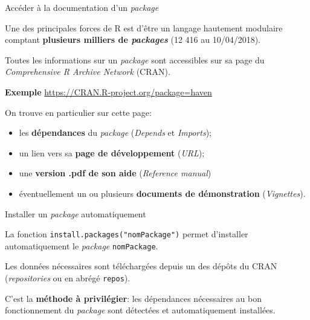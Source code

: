 \documentclass[12pt,ignorenonframetext,]{beamer}
\providecommand{\tightlist}{%
  \setlength{\itemsep}{0pt}\setlength{\parskip}{0pt}}
\newcommand{\intertitre}[1]{\textcolor{redInsee}{\textbf{#1}}}
\begin{document}
\begin{frame}{Accéder à la documentation d'un \emph{package}}

Une des principales forces de R est d'être un langage hautement
modulaire comptant \textbf{plusieurs milliers de \emph{packages}} (12
416 au 10/04/2018).

\pause Toutes les informations sur un \emph{package} sont accessibles
sur sa page du \emph{Comprehensive R Archive Network} (CRAN).

\intertitre{Exemple} \url{https://CRAN.R-project.org/package=haven}

\pause \bigskip On trouve en particulier sur cette page:

\begin{itemize}
\tightlist
\item
  les \textbf{dépendances} du \emph{package} (\emph{Depends} et
  \emph{Imports});
\item
  un lien vers sa \textbf{page de développement} (\emph{URL});
\item
  une \textbf{version .pdf de son aide} (\emph{Reference manual})
\item
  éventuellement un ou plusieurs \textbf{documents de démonstration}
  (\emph{Vignettes}).
\end{itemize}

\end{frame}

\begin{frame}[fragile]{Installer un \emph{package} automatiquement}

La fonction \texttt{install.packages("nomPackage")} permet d'installer
automatiquement le \emph{package} \texttt{nomPackage}.

Les données nécessaires sont téléchargées depuis un des dépôts du CRAN
(\emph{repositories} ou en abrégé \texttt{repos}).

C'est la \textbf{méthode à privilégier}: les dépendances nécessaires au
bon fonctionnement du \emph{package} sont détectées et automatiquement
installées.

\end{frame}
\end{document}
